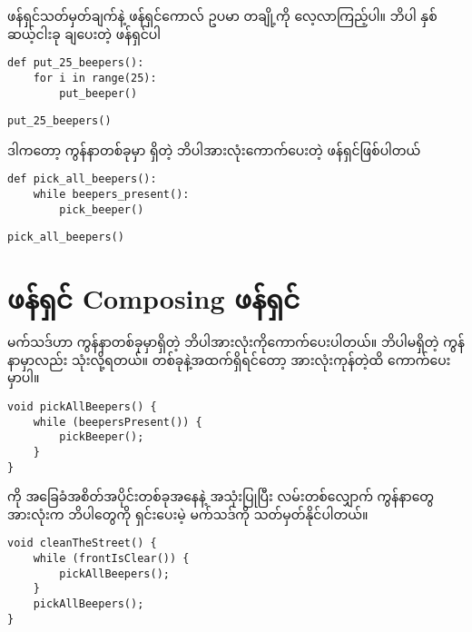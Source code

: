 ဖန်ရှင်သတ်မှတ်ချက်နဲ့ ဖန်ရှင်ကောလ် ဥပမာ တချို့ကို လေ့လာကြည့်ပါ။ ဘိပါ နှစ်ဆယ့်ငါးခု ချပေးတဲ့  ဖန်ရှင်ပါ 
%
\setlength{\fboxsep}{0pt}
\begin{verbatim}
def put_25_beepers():
    for i in range(25):
        put_beeper()
\end{verbatim}
%
\betweenminted{\medskipamount}
%
\setlength{\fboxsep}{0pt}
\begin{verbatim}
put_25_beepers()
\end{verbatim}
%
ဒါကတော့ ကွန်နာတစ်ခုမှာ ရှိတဲ့ ဘိပါအားလုံးကောက်ပေးတဲ့ ဖန်ရှင်ဖြစ်ပါတယ်
%
\setlength{\fboxsep}{0pt}
\begin{verbatim}
def pick_all_beepers():
    while beepers_present():
        pick_beeper()
\end{verbatim}
%
\betweenminted{\medskipamount}
%
\setlength{\fboxsep}{0pt}
\begin{verbatim}
pick_all_beepers()
\end{verbatim}
%
\betweenminted{3.75pt}
\section{ဖန်ရှင် Composing ဖန်ရှင်}
 မက်သဒ်ဟာ ကွန်နာတစ်ခုမှာရှိတဲ့ ဘိပါအားလုံးကိုကောက်ပေးပါတယ်။ ဘိပါမရှိတဲ့ ကွန်နာမှာလည်း သုံးလို့ရတယ်။ တစ်ခုနဲ့အထက်ရှိရင်တော့ အားလုံးကုန်တဲ့ထိ ကောက်ပေးမှာပါ။ 
%
\begin{verbatim}
void pickAllBeepers() {
    while (beepersPresent()) {
        pickBeeper();
    }
}
\end{verbatim}
%

 ကို အခြေခံအစိတ်အပိုင်းတစ်ခုအနေနဲ့ အသုံးပြုပြီး လမ်းတစ်လျှောက် ကွန်နာတွေအားလုံးက ဘိပါတွေကို ရှင်းပေးမဲ့  မက်သဒ်ကို သတ်မှတ်နိုင်ပါတယ်။
%
\begin{verbatim}
void cleanTheStreet() {
    while (frontIsClear()) {
        pickAllBeepers();
    }
    pickAllBeepers();
}
\end{verbatim}
%

